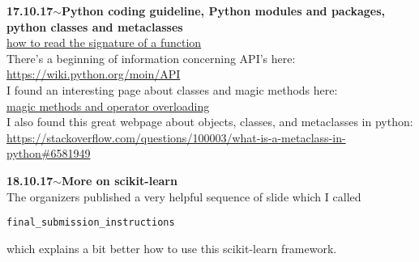 \documentclass[11pt,a4paper]{article}
\newenvironment{loggentry}[2]%
{\noindent\textbf{#1}\hspace{1cm}$\mathbf{\sim}$\text{ }\textbf{#2}\\}{\vspace{0.5cm}}
\begin{document}
\begin{loggentry}{17.10.17}{Python coding guideline, Python modules and packages, python classes and metaclasses}
\href{https://stackoverflow.com/questions/2677185/how-can-i-read-a-functions-signature-including-default-argument-values#2677263}{how to read the signature of a function}\\
There's a beginning of information concerning API's here:\\
\url{https://wiki.python.org/moin/API}\\
I found an interesting page about classes and magic methods here:\\
\href{https://www.python-course.eu/python3_magic_methods.php}{magic methods and operator overloading}\\
I also found this great webpage about objects, classes, and metaclasses in python:\\
\url{https://stackoverflow.com/questions/100003/what-is-a-metaclass-in-python#6581949}
\end{loggentry}

\begin{loggentry}{18.10.17}{More on scikit-learn}
The organizers published a very helpful sequence of slide which I called 
\begin{verbatim}
final_submission_instructions
\end{verbatim}
which explains a bit better how to use this scikit-learn framework.
\end{loggentry}
\end{document}
